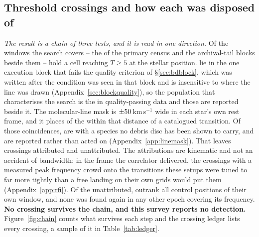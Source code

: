 \subsection{Threshold crossings and how each was disposed of}
\label{sec:technosearch}

\emph{The result is a chain of three tests, and it is read in one direction.}
Of the windows the search covers -- the \NWindows{} of the primary census
and the archival-tail blocks beside them -- \EvNCrossRaw{} hold a cell
reaching $T\geq5$ at the stellar position. \EvNCrossFlag{} lie in the one
execution block that fails the quality criterion of \S\ref{sec:bdblock}, which
was written after the condition was seen in that block and is insensitive to
where the line was drawn (Appendix~\ref{sec:blockquality}), so the population
that characterises the search is the \EvNCrossQp{} in quality-passing data and
those \EvNCrossFlag{} are reported beside it. The molecular-line mask is $\pm50$\,km\,s$^{-1}$ wide in each
star's own rest frame, and it places \MkNCoinc{} of the \EvNCrossQp{} within
that distance of a catalogued transition. Of those coincidences, \MkNSODecideWord{} are with a species no debris disc
has been shown to carry, and are reported rather than acted on
(Appendix~\ref{app:linemask}). That leaves
\EvNAttrQp{} crossings attributed and \EvNUnattrQp{} unattributed. The attributions are kinematic and not an accident of bandwidth: in the
frame the correlator delivered, the crossings with a measured peak frequency
crowd onto the transitions these setups were tuned to far more tightly than a
free landing on their own grids would put them (Appendix~\ref{app:rfi}). Of the unattributed,
\EvNRankQp{} outrank all \NCtrl{} control positions of their own window, and
none was found again in any other epoch covering its frequency. \textbf{No
crossing survives the chain, and this survey reports no detection.}
Figure~\ref{fig:chain} counts what survives each step and the crossing
ledger lists every crossing, a sample of it in Table~\ref{tab:ledger}.

